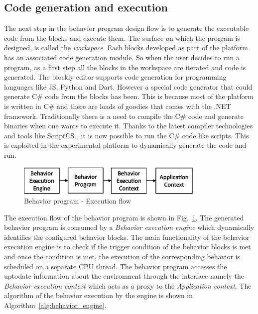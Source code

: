 \subsection{Code generation and execution}
The next step in the behavior program design flow is to generate the executable code from the blocks and execute them. The surface on which the program is designed, is called the \emph{workspace}. Each blocks developed as part of the platform has an associated code generation module. So when the user decides to run a program, as a first step all the blocks in the workspace are iterated and code is generated. The blockly editor supports code generation for programming languages like JS, Python and Dart. However a special code generator that could generate C\# code from the blocks has been. This is because most of the platform is written in C\# and there are loads of goodies that comes with the .NET framework. Traditionally there is a need to compile the C\# code and generate binaries when one wants to execute it. Thanks to the latest compiler technologies and tools like ScriptCS \cite{ScriptCS}, it is now possible to run the C\# code like scripts. This is exploited in the experimental platform to dynamically generate the code and run.
\begin{figure}[H]
\centering
\includegraphics[width=0.8\textwidth]{../thesis/assets/execution_flow.eps}
\caption[Behavior program - Execution flow]{Behavior program - Execution flow}
\label{fig:program_execution}
\end{figure}
 The execution flow of the behavior program is shown in Fig.~\ref{fig:program_execution}. The generated behavior program is consumed by a \emph{Behavior execution engine} which dynamically identifies the configured behavior blocks. The main functionality of the behavior execution engine is to check if the trigger condition of the behavior blocks is met and once the condition is met, the execution of the corresponding behavior is scheduled on a separate CPU thread. The behavior program accesses the uptodate information about the environment through the interface namely the \emph{Behavior execution context} which acts as a proxy to the \emph{Application context}. The algorithm of the behavior execution by the engine is shown in Algorithm~\ref{alg:behavior_engine}.

